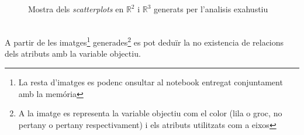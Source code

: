 \documentclass[a4paper, 11pt]{article}
\begin{document}
\begin{figure}[h]
    \centering
    \caption{Mostra dels \textit{scatterplots} en $\mathbb{R}^2$ i $\mathbb{R}^3$ generats per l'analisis exahustiu}
  \label{fig:colores}
\end{figure}\\
A partir de les imatges\footnote{La resta d'imatges es podenc onsultar al notebook entregat conjuntament amb la memória} generades\footnote{A la imatge es representa la variable objectiu com el color (lila o groc, no pertany o pertany respectivament) i els atributs utilitzats com a eixos} es pot deduïr la no existencia de relacions dels atributs amb la variable objectiu.\\
\end{document}
